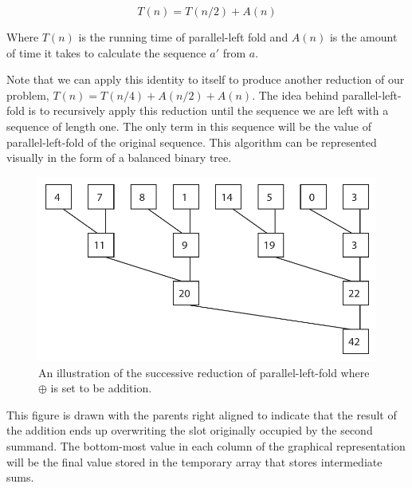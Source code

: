 \documentclass[12pt,twoside]{reedthesis}
\begin{document}
\begin{equation}
T(n) = T(n/2) + A(n) 
\label{rr}
\end{equation}

Where $T(n)$ is the running time of parallel-left fold and $A(n)$ is
the amount of time it takes to calculate the sequence $a'$ from $a$. 

Note that we can apply this identity to itself to produce another
reduction of our problem, $T(n) = T(n/4) + A(n/2) + A(n)$. The idea
behind parallel-left-fold is to recursively apply this reduction until
the sequence we are left with a sequence of length one. The only term
in this sequence will be the value of parallel-left-fold of the
original sequence. This algorithm can be represented visually in the
form of a balanced binary tree.

\begin{figure}[h]
\includegraphics{parallel-left-fold-tree.pdf}
\caption{An illustration of the successive reduction of
  parallel-left-fold where $\oplus$ is set to be addition.}
\end{figure}
\vspace{1pc}

This figure is drawn with the parents right aligned to indicate that
the result of the addition ends up overwriting the slot originally
occupied by the second summand. The bottom-most value in each column
of the graphical representation will be the final value stored in the
temporary array that stores intermediate sums.
\end{document}
